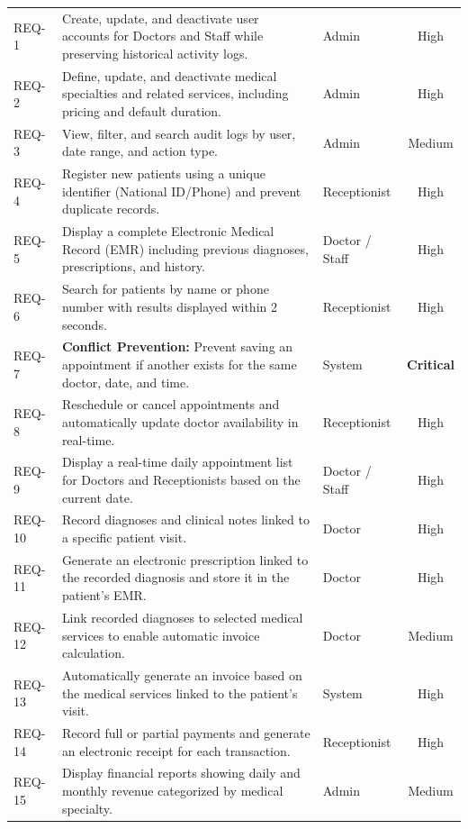 \begin{tabularx}{\textwidth}{l L l c}
	REQ-1  & Create, update, and deactivate user accounts for Doctors and Staff while preserving historical activity logs. & Admin & High \\ \addlinespace
	REQ-2  & Define, update, and deactivate medical specialties and related services, including pricing and default duration. & Admin & High \\ \addlinespace
	REQ-3  & View, filter, and search audit logs by user, date range, and action type. & Admin & Medium \\ \addlinespace
	REQ-4  & Register new patients using a unique identifier (National ID/Phone) and prevent duplicate records. & Receptionist & High \\ \addlinespace
	REQ-5  & Display a complete Electronic Medical Record (EMR) including previous diagnoses, prescriptions, and history. & Doctor / Staff & High \\ \addlinespace
	REQ-6  & Search for patients by name or phone number with results displayed within 2 seconds. & Receptionist & High \\ \addlinespace
	REQ-7  & \textbf{Conflict Prevention:} Prevent saving an appointment if another exists for the same doctor, date, and time. & System & \textbf{Critical} \\ \addlinespace
	REQ-8  & Reschedule or cancel appointments and automatically update doctor availability in real-time. & Receptionist & High \\ \addlinespace
	REQ-9  & Display a real-time daily appointment list for Doctors and Receptionists based on the current date. & Doctor / Staff & High \\ \addlinespace
	REQ-10 & Record diagnoses and clinical notes linked to a specific patient visit. & Doctor & High \\ \addlinespace
	REQ-11 & Generate an electronic prescription linked to the recorded diagnosis and store it in the patient’s EMR. & Doctor & High \\ \addlinespace
	REQ-12 & Link recorded diagnoses to selected medical services to enable automatic invoice calculation. & Doctor & Medium \\ \addlinespace
	REQ-13 & Automatically generate an invoice based on the medical services linked to the patient’s visit. & System & High \\ \addlinespace
	REQ-14 & Record full or partial payments and generate an electronic receipt for each transaction. & Receptionist & High \\ \addlinespace
	REQ-15 & Display financial reports showing daily and monthly revenue categorized by medical specialty. & Admin & Medium \\
	
	\bottomrule
\end{tabularx}